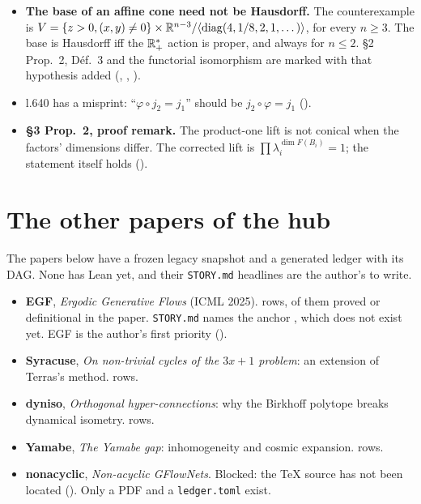 \begin{itemize}
\item \textbf{The base of an affine cone need not be Hausdorff.} The counterexample is
  $V=\{z>0,(x,y)\ne0\}\times\mathbb{R}^{n-3}/\langle\mathrm{diag}(4,1/8,2,1,\dots)\rangle$, for every
  $n\ge3$. The base is Hausdorff iff the $\mathbb{R}_+^*$ action is proper, and always for $n\le2$.
  §2 Prop.~2, Déf.~3 and the functorial isomorphism are marked with that hypothesis added
  (, , ).
\item l.640 has a misprint: ``$\varphi\circ j_2=j_1$'' should be $j_2\circ\varphi=j_1$
  ().
\item \textbf{§3 Prop.~2, proof remark.} The product-one lift is not conical when the factors'
  dimensions differ. The corrected lift is $\prod\lambda_i^{\dim F(B_i)}=1$; the statement itself
  holds ().
\end{itemize}

\section{The other papers of the hub}\label{sec:others}

The papers below have a frozen legacy snapshot and a generated ledger with its DAG. None has Lean
yet, and their \texttt{STORY.md} headlines are the author's to write.

\begin{itemize}
\item \textbf{EGF}, \emph{Ergodic Generative Flows} (ICML 2025). \numEgfStatements{} rows,
  \numEgfNlproved{} of them proved or definitional in the paper. \texttt{STORY.md} names the
  anchor , which does not exist yet. EGF is the author's first
  priority ().
\item \textbf{Syracuse}, \emph{On non-trivial cycles of the $3x+1$ problem}: an extension of
  Terras's method. \numSyracuseStatements{} rows.
\item \textbf{dyniso}, \emph{Orthogonal hyper-connections}: why the Birkhoff polytope breaks
  dynamical isometry. \numDynisoStatements{} rows.
\item \textbf{Yamabe}, \emph{The Yamabe gap}: inhomogeneity and cosmic expansion.
  \numYamabeStatements{} rows.
\item \textbf{nonacyclic}, \emph{Non-acyclic GFlowNets}. Blocked: the \TeX{} source has not been
  located (). Only a PDF and a \texttt{ledger.toml} exist.
\end{itemize}

